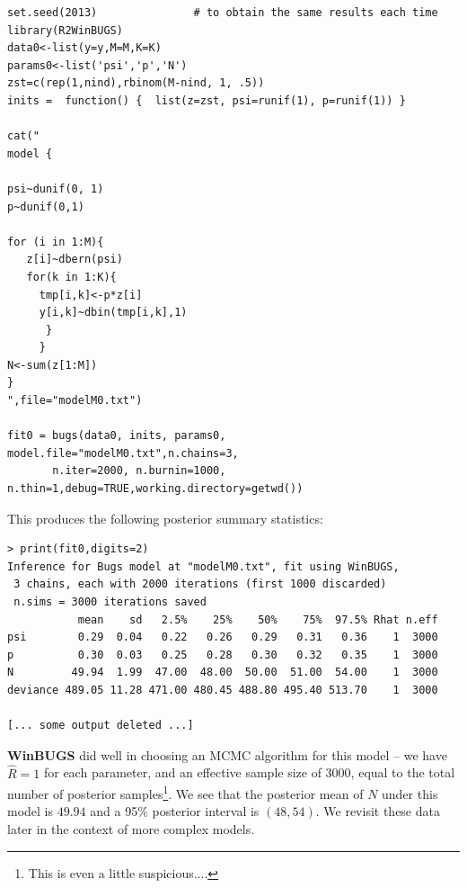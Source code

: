{\small
\begin{verbatim}
set.seed(2013)               # to obtain the same results each time
library(R2WinBUGS)
data0<-list(y=y,M=M,K=K)
params0<-list('psi','p','N')
zst=c(rep(1,nind),rbinom(M-nind, 1, .5))
inits =  function() {  list(z=zst, psi=runif(1), p=runif(1)) }

cat("
model {

psi~dunif(0, 1)
p~dunif(0,1)

for (i in 1:M){
   z[i]~dbern(psi)
   for(k in 1:K){
     tmp[i,k]<-p*z[i]
     y[i,k]~dbin(tmp[i,k],1)
      }
     }
N<-sum(z[1:M])
}
",file="modelM0.txt")

fit0 = bugs(data0, inits, params0, model.file="modelM0.txt",n.chains=3, 
       n.iter=2000, n.burnin=1000, n.thin=1,debug=TRUE,working.directory=getwd())
\end{verbatim}
}
This produces the following posterior
 summary statistics:
{\small
\begin{verbatim}
> print(fit0,digits=2)
Inference for Bugs model at "modelM0.txt", fit using WinBUGS,
 3 chains, each with 2000 iterations (first 1000 discarded)
 n.sims = 3000 iterations saved
           mean    sd   2.5%    25%    50%    75%  97.5% Rhat n.eff
psi        0.29  0.04   0.22   0.26   0.29   0.31   0.36    1  3000
p          0.30  0.03   0.25   0.28   0.30   0.32   0.35    1  3000
N         49.94  1.99  47.00  48.00  50.00  51.00  54.00    1  3000
deviance 489.05 11.28 471.00 480.45 488.80 495.40 513.70    1  3000

[... some output deleted ...]
\end{verbatim}
}
{\bf WinBUGS} did well in choosing an MCMC algorithm for this model --
we have $\hat{R} = 1$ for each parameter, and an effective sample size
of 3000, equal to the total number of posterior samples\footnote{This is even a little
suspicious....}.
We see that the posterior mean of $N$ under this
model is $49.94$ and a 95\% posterior interval is $(48,54)$.  We
revisit these data later in the context of more complex models.

